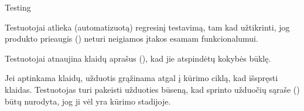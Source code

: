 \begin{processTable}{Testing}
{        \item Testuotojai atlieka (automatizuotą) regresinį testavimą, tam kad užtikrinti, jog produkto prieaugis () neturi neigiamos įtakos esamam funkcionalumui.

        \item Testuotojai atnaujina klaidų aprašus (), kad jie atspindėtų kokybės būklę.

        \item Jei aptinkama klaidų, užduotis grąžinama atgal į kūrimo ciklą, kad išspręsti klaidas. Testuotojas turi pakeisti užduoties būseną, kad sprinto užduočių sąraše () būtų nurodyta, jog ji vėl yra kūrimo stadijoje.
    }
\end{processTable}

\newpage
\subsubsection{}

